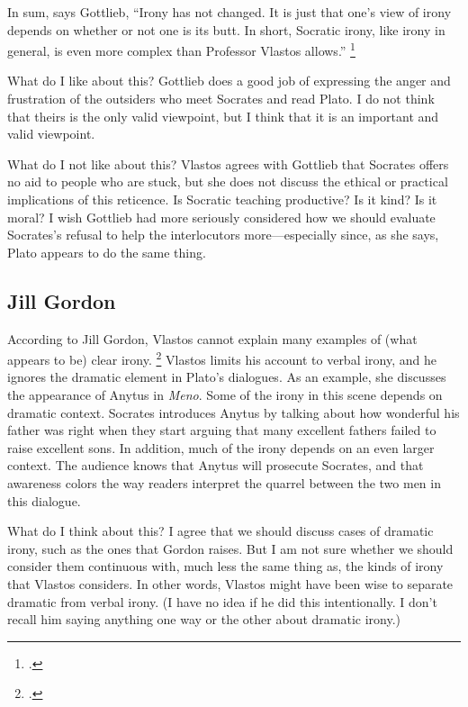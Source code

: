 \documentclass[12pt,letterpaper]{article}
\begin{document}
In sum, says Gottlieb, 
``Irony has not changed.
It is just that one's view of irony depends on whether or not one is its butt.
In short, Socratic irony, like irony in general, is even more complex than Professor Vlastos allows.''
\footcite[][279]{gottlieb-complexity-socratic-irony-1992}

What do I like about this?
Gottlieb does a good job of expressing the anger and frustration of the outsiders who meet Socrates and read Plato.
I do not think that theirs is the only valid viewpoint, but I think that it is an important and valid viewpoint.

What do I not like about this?
Vlastos agrees with Gottlieb that Socrates offers no aid to people who are stuck, but she does not discuss the ethical or practical implications of this reticence.
Is Socratic teaching productive?
Is it kind?
Is it moral?
I wish Gottlieb had more seriously considered how we should evaluate Socrates's refusal to help the interlocutors more—especially since, as she says, Plato appears to do the same thing.

\subsection*{Jill Gordon}

According to Jill Gordon, Vlastos cannot explain many examples of (what appears to be) clear irony.
\footcite{gordon-against-vlastos-1996}
Vlastos limits his account to verbal irony, and he ignores the dramatic element in Plato's dialogues.
As an example, she discusses the appearance of Anytus in \textit{Meno}.
Some of the irony in this scene depends on dramatic context.
Socrates introduces Anytus by talking about how wonderful his father was right when they start arguing that many excellent fathers failed to raise excellent sons.
In addition, much of the irony depends on an even larger context.
The audience knows that Anytus will prosecute Socrates, and that awareness colors the way readers interpret the quarrel between the two men in this dialogue.

What do I think about this?
I agree that we should discuss cases of dramatic irony, such as the ones that Gordon raises.
But I am not sure whether we should consider them continuous with, much less the same thing as, the kinds of irony that Vlastos considers.
In other words, Vlastos might have been wise to separate dramatic from verbal irony.
(I have no idea if he did this intentionally.
I don't recall him saying anything one way or the other about dramatic irony.)
\end{document}
